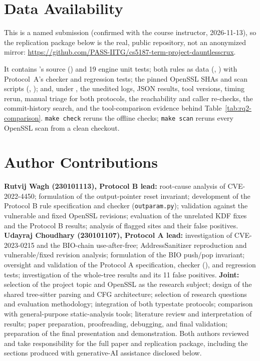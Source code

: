 \section*{Data Availability}
\label{sec:data}
This is a named submission (confirmed with the course instructor,
2026-11-13), so the replication package below is the real, public
repository, not an anonymized mirror:
\url{https://github.com/PASS-IITG/cs5187-term-project-dauntlesscrux}.

It contains \tool's source () and 19 engine unit tests;
both rules as data (,
) with Protocol~A's checker and regression
tests; the pinned OpenSSL SHAs and scan scripts (,
); and, under , the
unedited logs, JSON results, tool versions, timing rerun, manual triage
for both protocols, the reachability and caller re-checks, the
commit-history search, and the tool-comparison evidence behind
Table~\ref{tab:rq2-comparison}. \texttt{make check} reruns the offline
checks; \texttt{make scan} reruns every OpenSSL scan from a clean checkout.

\section*{Author Contributions}
\textbf{Rutvij Wagh (230101113), Protocol B lead:} root-cause analysis of
CVE-2022-4450; formulation of the output-pointer reset invariant;
development of the Protocol B rule specification and checker
(\texttt{outparam.py}); validation against the vulnerable and fixed
OpenSSL revisions; evaluation of the unrelated KDF fixes and the Protocol
B results; analysis of flagged sites and their false positives.
\textbf{Udayraj Choudhary (230101107), Protocol A lead:} investigation of
CVE-2023-0215 and the BIO-chain use-after-free; AddressSanitizer
reproduction and vulnerable/fixed revision analysis; formulation of the
BIO push/pop invariant; oversight and validation of the Protocol A
specification, checker (), and regression tests;
investigation of the whole-tree results and its 11 false positives.
\textbf{Joint:} selection of the project topic and OpenSSL as the
research subject; design of the shared tree-sitter parsing and CFG
architecture; selection of research questions and evaluation
methodology; integration of both typestate protocols; comparison with
general-purpose static-analysis tools; literature review and
interpretation of results; paper preparation, proofreading, debugging,
and final validation; preparation of the final presentation and
demonstration. Both authors reviewed and take responsibility for the
full paper and replication package, including the sections produced
with generative-AI assistance disclosed below.

